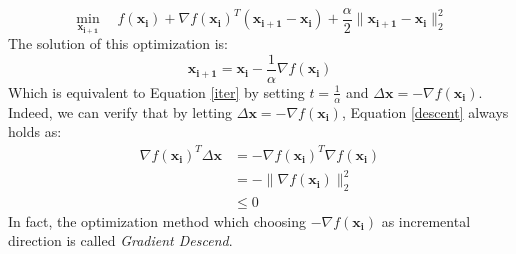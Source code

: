 \documentclass[10pt,a4paper]{article}
\begin{document}
\begin{equation*}
	\displaystyle\min_{\mathbf{x_{i + 1}}} \quad f(\mathbf{x_{i}}) + \nabla f(\mathbf{x_{i}})^{T} (\mathbf{x_{i + 1}} - \mathbf{x_{i}}) + \frac{\alpha}{2} \| \mathbf{x_{i + 1}} - \mathbf{x_{i}} \|^{2}_{2}
\end{equation*}
The solution of this optimization is:
\begin{equation*}
	\mathbf{x_{i + 1}} = \mathbf{x_{i}} - \frac{1}{\alpha} \nabla f(\mathbf{x_{i}})
\end{equation*}
Which is equivalent to Equation \ref{iter} by setting $t = \frac{1}{\alpha}$ and $\Delta \mathbf{x} = - \nabla f(\mathbf{x_{i}})$. Indeed, we can verify that by letting $\Delta \mathbf{x} = - \nabla f(\mathbf{x_{i}})$, Equation \ref{descent} always holds as: 
\begin{equation*}
	\begin{aligned}
		\nabla f(\mathbf{x_{i}})^{T} \Delta \mathbf{x} &= - \nabla f(\mathbf{x_{i}})^{T} \nabla f(\mathbf{x_{i}}) \\
		&= - \| \nabla f(\mathbf{x_{i}}) \|^{2}_{2} \\
		&\leq 0
	\end{aligned}
\end{equation*}
In fact, the optimization method which choosing $- \nabla f(\mathbf{x_{i}})$ as incremental direction is called \textit{Gradient Descend}.
\end{document}

